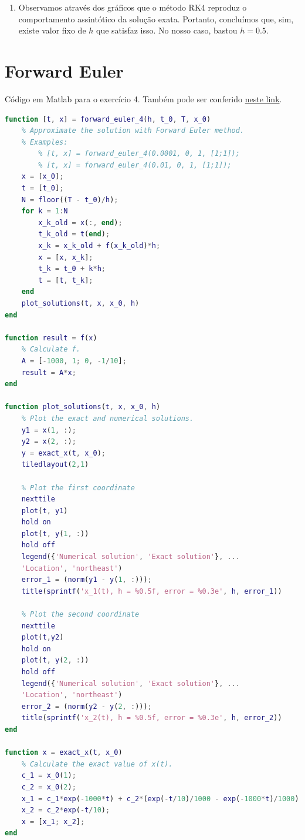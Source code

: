 \documentclass{article}
\begin{document}
\begin{enumerate}
\begin{enumerate}
                    \item Observamos através dos gráficos que o método RK4 reproduz
                        o comportamento assintótico da solução exata. Portanto,
                        concluímos que, sim, existe valor fixo de $h$ que satisfaz
                        isso. No nosso caso, bastou $h = 0.5$.
                \end{enumerate} 
    \end{enumerate}

    \clearpage

    \appendix

    \section{Forward Euler}
        \label{appendix:forward_euler}

        Código em Matlab para o exercício 4. Também pode ser conferido
        \href{https://github.com/lucasresck/introduction-to-numerical-analysis/blob/master/list_4/forward_euler_4.m}{neste link}.

        \begin{lstlisting}[language=Matlab]
function [t, x] = forward_euler_4(h, t_0, T, x_0)
    % Approximate the solution with Forward Euler method.
    % Examples:
        % [t, x] = forward_euler_4(0.0001, 0, 1, [1;1]);
        % [t, x] = forward_euler_4(0.01, 0, 1, [1;1]);
    x = [x_0];
    t = [t_0];
    N = floor((T - t_0)/h);
    for k = 1:N
        x_k_old = x(:, end);
        t_k_old = t(end);
        x_k = x_k_old + f(x_k_old)*h;
        x = [x, x_k];
        t_k = t_0 + k*h;
        t = [t, t_k];
    end
    plot_solutions(t, x, x_0, h)
end

function result = f(x)
    % Calculate f.
    A = [-1000, 1; 0, -1/10];
    result = A*x;
end

function plot_solutions(t, x, x_0, h)
    % Plot the exact and numerical solutions.
    y1 = x(1, :);
    y2 = x(2, :);
    y = exact_x(t, x_0);
    tiledlayout(2,1)
    
    % Plot the first coordinate
    nexttile
    plot(t, y1)
    hold on
    plot(t, y(1, :))
    hold off
    legend({'Numerical solution', 'Exact solution'}, ...
    'Location', 'northeast')
    error_1 = (norm(y1 - y(1, :)));
    title(sprintf('x_1(t), h = %0.5f, error = %0.3e', h, error_1))

    % Plot the second coordinate
    nexttile
    plot(t,y2)
    hold on
    plot(t, y(2, :))
    hold off
    legend({'Numerical solution', 'Exact solution'}, ...
    'Location', 'northeast')
    error_2 = (norm(y2 - y(2, :)));
    title(sprintf('x_2(t), h = %0.5f, error = %0.3e', h, error_2))
end

function x = exact_x(t, x_0)
    % Calculate the exact value of x(t).
    c_1 = x_0(1);
    c_2 = x_0(2);
    x_1 = c_1*exp(-1000*t) + c_2*(exp(-t/10)/1000 - exp(-1000*t)/1000);
    x_2 = c_2*exp(-t/10);
    x = [x_1; x_2];
end
        \end{lstlisting}
\end{document}

